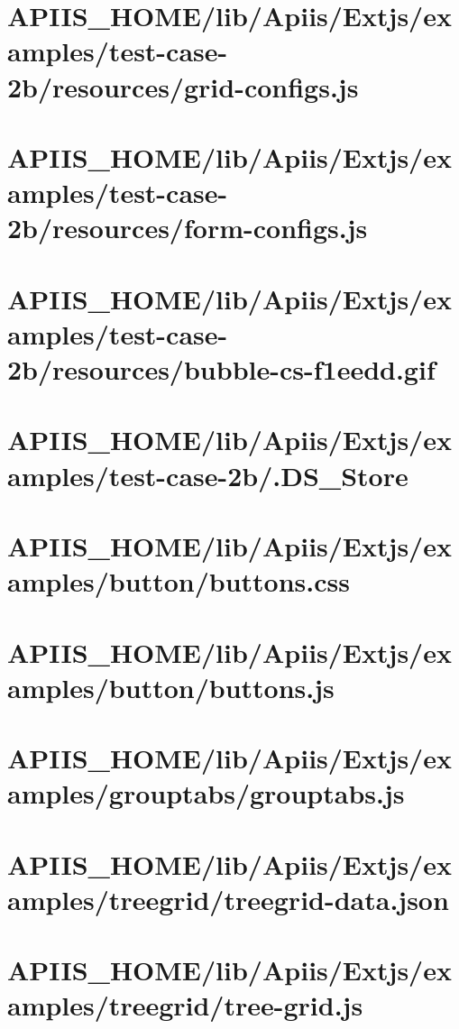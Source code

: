 \section{APIIS\_HOME/lib/Apiis/Extjs/examples/test-case-2b/resources/grid-configs.js} 
\section{APIIS\_HOME/lib/Apiis/Extjs/examples/test-case-2b/resources/form-configs.js} 
\section{APIIS\_HOME/lib/Apiis/Extjs/examples/test-case-2b/resources/bubble-cs-f1eedd.gif} 
\section{APIIS\_HOME/lib/Apiis/Extjs/examples/test-case-2b/.DS\_Store} 
\section{APIIS\_HOME/lib/Apiis/Extjs/examples/button/buttons.css} 
\section{APIIS\_HOME/lib/Apiis/Extjs/examples/button/buttons.js} 
\section{APIIS\_HOME/lib/Apiis/Extjs/examples/grouptabs/grouptabs.js} 
\section{APIIS\_HOME/lib/Apiis/Extjs/examples/treegrid/treegrid-data.json} 
\section{APIIS\_HOME/lib/Apiis/Extjs/examples/treegrid/tree-grid.js} 
